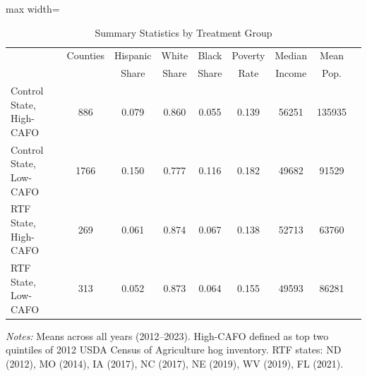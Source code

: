 \begin{table}[htbp]
\centering
\caption{Summary Statistics by Treatment Group}
\label{tab:summary}
\begin{adjustbox}{max width=\textwidth}
\begin{tabular}{lcccccccc}
\hline\hline
& Counties & Hispanic & White & Black & Poverty & Median & Mean \\
& & Share & Share & Share & Rate & Income & Pop. \\
\hline
Control State, High-CAFO & 886 & 0.079 & 0.860 & 0.055 & 0.139 & 56251 & 135935 \\
Control State, Low-CAFO & 1766 & 0.150 & 0.777 & 0.116 & 0.182 & 49682 & 91529 \\
RTF State, High-CAFO & 269 & 0.061 & 0.874 & 0.067 & 0.138 & 52713 & 63760 \\
RTF State, Low-CAFO & 313 & 0.052 & 0.873 & 0.064 & 0.155 & 49593 & 86281 \\
\hline\hline
\end{tabular}
\end{adjustbox}
\begin{tablenotes}[flushleft]
\item \textit{Notes:} Means across all years (2012--2023). High-CAFO defined as top two quintiles of 2012 USDA Census of Agriculture hog inventory. RTF states: ND (2012), MO (2014), IA (2017), NC (2017), NE (2019), WV (2019), FL (2021).
\end{tablenotes}
\end{table}
